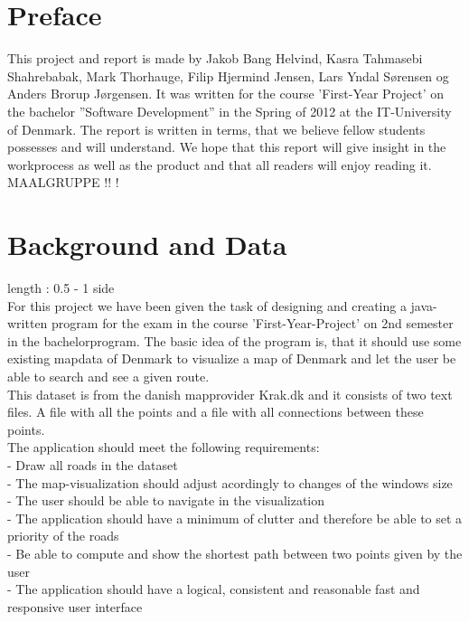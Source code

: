 \documentclass[a4paper,10pt,titlepage]{article}
\begin{document}
	\tableofcontents
	\newpage
	\section{Preface}
		This project and report is made by Jakob Bang Helvind, Kasra Tahmasebi Shahrebabak, Mark Thorhauge, Filip Hjermind Jensen, Lars Yndal Sørensen og
		Anders Brorup Jørgensen. It was written for the course ’First-Year Project’ on the bachelor ”Software Development” in the Spring of 2012 at the
		IT-University of Denmark. The report is written in terms, that we believe fellow students possesses and will understand. We hope that this 
		report will give insight in the workprocess as well as the product and that all readers will enjoy reading it.\\
		MAALGRUPPE !! ! 
	
	\section{Background and Data}
		length : 0.5 - 1 side\\
		For this project we have been given the task of designing and creating a java-written program 
		for the exam in the course 'First-Year-Project' on 2nd semester in the bachelorprogram. The basic idea of the 
		program is, that it should use some existing mapdata of Denmark to visualize a map of Denmark and let the user be
		able to search and see a given route. 
		\\This dataset is from the danish mapprovider Krak.dk and it consists of two text files. A file with all the points 
		and a file with all connections between these points.  
		\\The application should meet the following requirements:
		\\	- Draw all roads in the dataset
		\\	- The map-visualization should adjust acordingly to changes of the windows size
		\\	- The user should be able to navigate in the visualization
		\\	- The application should have a minimum of clutter and therefore be able to set a priority of the roads
		\\	- Be able to compute and show the shortest path between two points given by the user
		\\	- The application should have a logical, consistent and reasonable fast and responsive user interface\\
		
\end{document}
